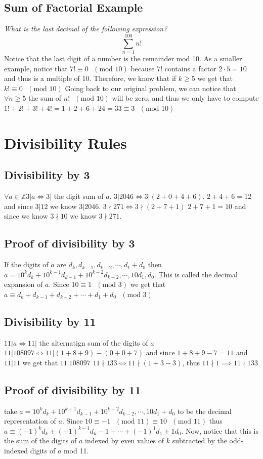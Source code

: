 \documentclass[oneside]{book}
\newcommand\tab[1][1cm]{\hspace*{#1}}
\newcommand\nextline{\newline\tab}
\renewcommand\mod[1]{\text{ }\left(\text{mod }#1\right)}
\begin{document}
\subsection{Sum of Factorial Example}
\tab
\textit{What is the last decimal of the following expression?}
$$\sum_{n=1}^{100} n!$$
\nextline
Notice that the last digit of a number is the remainder mod 10. As a smaller example, notice that $7!\equiv 0\mod{10}$ because $7!$ contains a factor $2\cdot5=10$ and thus is a multiple of 10. Therefore, we know that if $k\geq 5$ we get that $k!\equiv 0\mod{10}$
\nextline
Going back to our original problem, we can notice that $\forall n\geq 5$ the sum of $n!\mod{10}$ will be zero, and thus we only have to compute $1!+2!+3!+4!=1+2+6+24=33\equiv 3\mod{10}$
\section{Divisibility Rules}
\subsection{Divisibility by 3}
\tab
$\forall a \in \mathbb{Z} 3\lvert a \iff 3\lvert$ the digit sum of $a$.
\nextline
$3\lvert 2046 \iff 3\lvert(2+0+4+6)$. $2+4+6=12$ and since $3\lvert12$ we know $3\lvert 2046$. \nextline
$3\nmid271 \iff 3\nmid(2+7+1)$ $2+7+1=10$ and since we know $3\nmid 10$ we know $3\nmid 271$.
\subsection{Proof of divisibility by 3}
\tab
If the digits of $a$ are $d_k, d_{k-1}, d_{k-2}, \cdots, d_1+d_0$ then $a=10^kd_k + 10^{k-1}d_{k-1}+10^{k-2}d_{k-2}, \cdots, 10d_1, d_0$. This is called the decimal expansion of $a$. Since $10\equiv 1\mod{3}$ we get that \newline$a\equiv d_k + d_{k-1} + d_{k-2} + \cdots + d_1 + d_0\mod{3}$
\subsection{Divisibility by 11}
\tab
$11\lvert a \iff 11\lvert$ the alternatign sum of the digits of $a$\nextline
$11\lvert108097\iff 11\lvert(1+8+9) - (0+0+7)$ and since $1+8+9-7=11$ and $11\lvert 11$ we get that $11\lvert 108097$\nextline
$11\nmid133 \iff 11\nmid(1+3-3)$, thus $11\nmid1\implies 11\nmid133$
\subsection{Proof of divisibility by 11}
\tab take
$a=10^kd_k + 10^{k-1}d_{k-1}+10^{k-2}d_{k-2}, \cdots, 10d_1+ d_0$ to be the decimal representation of $a$. Since $10\equiv-1\mod{11}\equiv 10\mod{11}$  thus
$a\equiv (-1)^kd_k + (-1)^{k-1}d_k-1 + \cdots + (-1)^1d_1 + 1d_0$. Now, notice that this is the sum of the digits of $a$ indexed by even values of $k$ subtracted by the odd-indexed digits of $a$ mod 11.
\end{document}

